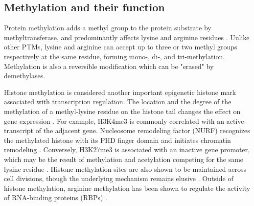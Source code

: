 \subsection{Methylation and their function}
Protein methylation adds a methyl group to the protein substrate by methyltransferase, and predominantly affects lysine and arginine residues \cite{murnj_shiy:WindingPath2017}. Unlike other PTMs, lysine and arginine can accept up to three or two methyl groups respectively at the same residue, forming mono-, di-, and tri-methylation. Methylation is also a reversible modification which can be "erased" by demethylases.

Histone methylation is considered another important epigenetic histone mark associated with transcription regulation. The location and the degree of the methylation of a methyl-lysine residue on the histone tail changes the effect on gene expression \cite{greerel_shiy:HistoneMethylation2012}. For example, H3K4me3 is commonly correlated with an active transcript of the adjacent gene. Nucleosome remodeling factor (NURF) recognizes the methylated histone with its PHD finger domain and initiates chromatin remodeling \cite{wysockaj_alliscd:PHDFinger2006}. Conversely, H3K27me3 is associated with an inactive gene promoter, which may be the result of methylation and acetylation competing for the same lysine residue \cite{pasinid_helink:CharacterizationAntagonistic2010}. Histone methylation sites are also shown to be maintained across cell divisions, though the underlying mechanism remains elusive \cite{greerel_shiy:HistoneMethylation2012}. Outside of histone methylation, arginine methylation has been shown to regulate the activity of RNA-binding proteins (RBPs) \cite{murnj_shiy:WindingPath2017}.


